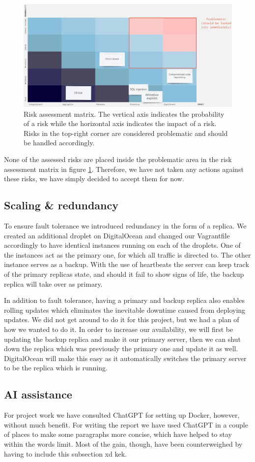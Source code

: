 \begin{figure}[H]
    \centering
    \includegraphics[width=\textwidth]{images/risk_matrix.png}
    \caption{Risk assessment matrix. The vertical axis indicates the probability of a risk while the horizontal axis indicates the impact of a risk. Risks in the top-right corner are considered problematic and should be handled accordingly.}
    \label{fig:risk_matrix}
\end{figure}

None of the assessed risks are placed inside the problematic area in the risk assessment matrix in figure \ref{fig:risk_matrix}. Therefore, we have not taken any actions against these risks, we have simply decided to accept them for now.

\subsection{Scaling \& redundancy} \label{sec:scaling}
To ensure fault tolerance we introduced redundancy in the form of a replica. We created an additional droplet on DigitalOcean and changed our Vagrantfile accordingly to have identical instances running on each of the droplets. One of the instances act as the primary one, for which all traffic is directed to. The other instance serves as a backup. With the use of heartbeats the server can keep track of the primary replicas state, and should it fail to show signs of life, the backup replica will take over as primary.

In addition to fault tolerance, having a primary and backup replica also enables rolling updates which eliminates the inevitable downtime caused from deploying updates. We did not get around to do it for this project, but we had a plan of how we wanted to do it. In order to increase our availability, we will first be updating the backup replica and make it our primary server, then we can shut down the replica which was previously the primary one and update it as well. DigitalOcean will make this easy as it automatically switches the primary server to be the replica which is running.

\subsection{AI assistance}
For project work we have consulted ChatGPT for setting up Docker, however, without much benefit. For writing the report we have used ChatGPT in a couple of places to make some paragraphs more concise, which have helped to stay within the words limit. Most of the gain, though, have been counterweighed by having to include this subsection xd kek.